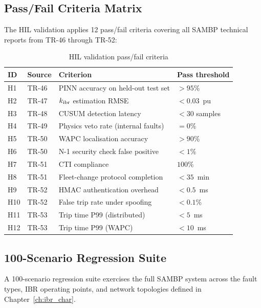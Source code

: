 \subsection{Pass/Fail Criteria Matrix}

The HIL validation applies 12 pass/fail criteria covering all SAMBP
technical reports from TR-46 through TR-52:

\begin{table}[htbp]
\caption{HIL validation pass/fail criteria}
\label{tab:ch9_hil_criteria}
\small
\begin{tabularx}{\textwidth}{@{}llXl@{}}
\toprule
ID & Source & Criterion & Pass threshold \\
\midrule
H1 & TR-46 & PINN accuracy on held-out test set & $> 95\%$ \\
H2 & TR-47 & $k_\mathrm{ibr}$ estimation RMSE & $< 0.03$~pu \\
H3 & TR-48 & CUSUM detection latency & $< 30$ samples \\
H4 & TR-49 & Physics veto rate (internal faults) & $= 0\%$ \\
H5 & TR-50 & WAPC localisation accuracy & $> 90\%$ \\
H6 & TR-50 & N-1 security check false positive & $< 1\%$ \\
H7 & TR-51 & CTI compliance & $100\%$ \\
H8 & TR-51 & Fleet-change protocol completion & $< 35$~min \\
H9 & TR-52 & HMAC authentication overhead & $< 0.5$~ms \\
H10 & TR-52 & False trip rate under spoofing & $< 0.1\%$ \\
H11 & TR-53 & Trip time P99 (distributed) & $< 5$~ms \\
H12 & TR-53 & Trip time P99 (WAPC) & $< 10$~ms \\
\bottomrule
\end{tabularx}
\end{table}

\subsection{100-Scenario Regression Suite}

A 100-scenario regression suite exercises the full SAMBP system across
the fault types, IBR operating points, and network topologies defined
in Chapter~\ref{ch:ibr_char}.

